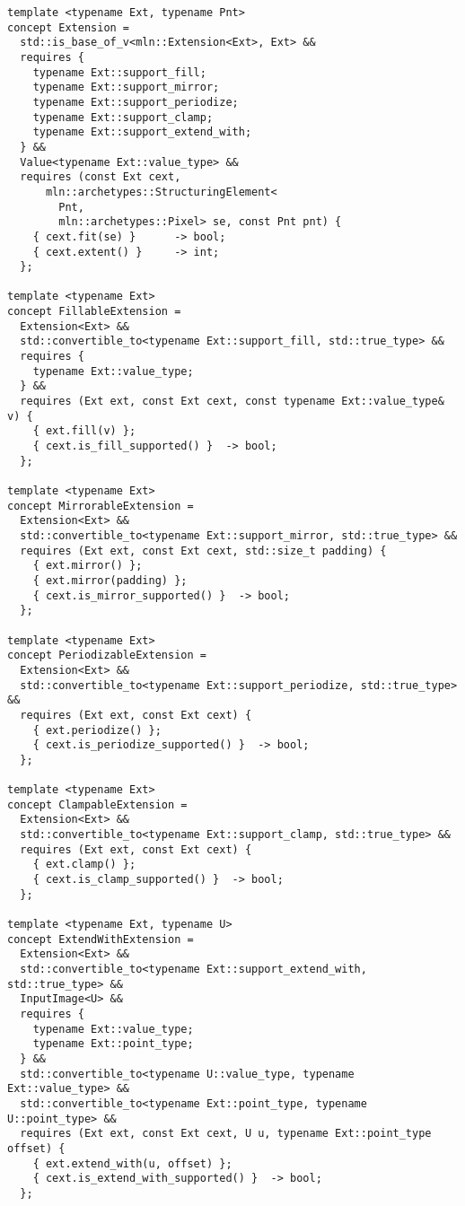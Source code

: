 \begin{verbatim}
template <typename Ext, typename Pnt>
concept Extension =
  std::is_base_of_v<mln::Extension<Ext>, Ext> &&
  requires {
    typename Ext::support_fill;
    typename Ext::support_mirror;
    typename Ext::support_periodize;
    typename Ext::support_clamp;
    typename Ext::support_extend_with;
  } &&
  Value<typename Ext::value_type> &&
  requires (const Ext cext,
      mln::archetypes::StructuringElement<
        Pnt,
        mln::archetypes::Pixel> se, const Pnt pnt) {
    { cext.fit(se) }      -> bool;
    { cext.extent() }     -> int;
  };

template <typename Ext>
concept FillableExtension =
  Extension<Ext> &&
  std::convertible_to<typename Ext::support_fill, std::true_type> &&
  requires {
    typename Ext::value_type;
  } &&
  requires (Ext ext, const Ext cext, const typename Ext::value_type& v) {
    { ext.fill(v) };
    { cext.is_fill_supported() }  -> bool;
  };

template <typename Ext>
concept MirrorableExtension =
  Extension<Ext> &&
  std::convertible_to<typename Ext::support_mirror, std::true_type> &&
  requires (Ext ext, const Ext cext, std::size_t padding) {
    { ext.mirror() };
    { ext.mirror(padding) };
    { cext.is_mirror_supported() }  -> bool;
  };

template <typename Ext>
concept PeriodizableExtension =
  Extension<Ext> &&
  std::convertible_to<typename Ext::support_periodize, std::true_type> &&
  requires (Ext ext, const Ext cext) {
    { ext.periodize() };
    { cext.is_periodize_supported() }  -> bool;
  };

template <typename Ext>
concept ClampableExtension =
  Extension<Ext> &&
  std::convertible_to<typename Ext::support_clamp, std::true_type> &&
  requires (Ext ext, const Ext cext) {
    { ext.clamp() };
    { cext.is_clamp_supported() }  -> bool;
  };

template <typename Ext, typename U>
concept ExtendWithExtension =
  Extension<Ext> &&
  std::convertible_to<typename Ext::support_extend_with, std::true_type> &&
  InputImage<U> &&
  requires {
    typename Ext::value_type;
    typename Ext::point_type;
  } &&
  std::convertible_to<typename U::value_type, typename Ext::value_type> &&
  std::convertible_to<typename Ext::point_type, typename U::point_type> &&
  requires (Ext ext, const Ext cext, U u, typename Ext::point_type offset) {
    { ext.extend_with(u, offset) };
    { cext.is_extend_with_supported() }  -> bool;
  };
\end{verbatim}


